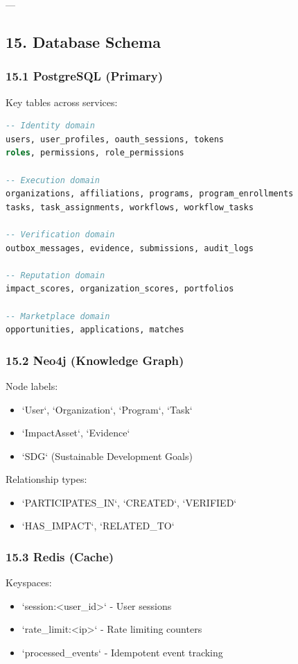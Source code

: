 \documentclass[11pt,a4paper]{article}
\begin{document}
---

\subsection{15. Database Schema}

\subsubsection{15.1 PostgreSQL (Primary)}

Key tables across services:

\begin{lstlisting}[language=sql, caption=sql code]
-- Identity domain
users, user_profiles, oauth_sessions, tokens
roles, permissions, role_permissions

-- Execution domain
organizations, affiliations, programs, program_enrollments
tasks, task_assignments, workflows, workflow_tasks

-- Verification domain
outbox_messages, evidence, submissions, audit_logs

-- Reputation domain
impact_scores, organization_scores, portfolios

-- Marketplace domain
opportunities, applications, matches
\end{lstlisting}

\subsubsection{15.2 Neo4j (Knowledge Graph)}

Node labels:
\begin{itemize}
\item `User`, `Organization`, `Program`, `Task`
\item `ImpactAsset`, `Evidence`
\item `SDG` (Sustainable Development Goals)
\end{itemize}

Relationship types:
\begin{itemize}
\item `PARTICIPATES_IN`, `CREATED`, `VERIFIED`
\item `HAS_IMPACT`, `RELATED_TO`
\end{itemize}

\subsubsection{15.3 Redis (Cache)}

Keyspaces:
\begin{itemize}
\item `session:<user_id>` - User sessions
\item `rate_limit:<ip>` - Rate limiting counters
\item `processed_events` - Idempotent event tracking
\end{itemize}
\end{document}
